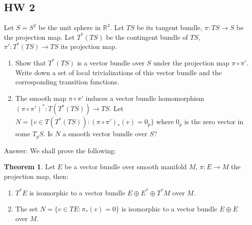 \documentclass{article}
\theoremstyle{definition}
\newtheorem{thm}{Theorem}[section]
\begin{document}
\newpage

\subsection{HW 2}

Let $S=S^2$ be the unit sphere in $\mathbb{R}^3$. Let $TS$ be its tangent bundle, $\pi: TS\rightarrow S$ be the projection map. Let $T^*(TS)$ be the contingent bundle of $TS$,
$\pi': T^*(TS)\rightarrow TS$ its projection map.
\begin{enumerate}[(1)]
    \item Show that $T^*(TS)$
is a vector bundle over $S$ under the projection map $\pi\circ \pi'$. Write down a set of local trivializations of this vector bundle and the corresponding transition functions.
\item The smooth map $\pi\circ \pi'$ induces a vector bundle homomorphism $(\pi\circ \pi')^*: T(T^*(TS))\rightarrow TS$. Let $N=\{v\in T(T^*(TS)): (\pi\circ \pi')_*(v)=0_p\}$ where $0_p$ is the zero vector in some $T_pS$. Is $N$ a smooth vector bundle over $S$?
\end{enumerate}

Answer: We shall prove the following:

\begin{thm}
    Let $E$ be a vector bundle over smooth manifold $M$, $\pi: E\rightarrow M$ the projection map, then:
    \begin{enumerate}
        \item $T^*E$ is isomorphic to a vector bundle $E\oplus E^*\oplus T^*M$ over $M$.
        \item The set $N=\{v\in TE: \pi_*(v)=0\}$ is isomorphic to a vector bundle $E\oplus E$ over $M$.
    \end{enumerate}
\end{thm}
\end{document}
